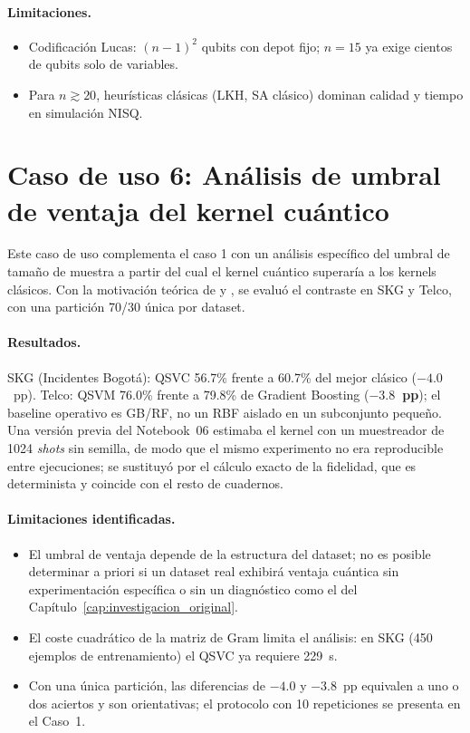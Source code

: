 \paragraph{Limitaciones.}
\begin{itemize}
  \item Codificación Lucas: $(n-1)^2$ qubits con depot fijo; $n=15$ ya exige cientos de qubits solo de variables.
  \item Para $n \gtrsim 20$, heurísticas clásicas (LKH, SA clásico) dominan calidad y tiempo en simulación NISQ.
\end{itemize}

\section{Caso de uso 6: Análisis de umbral de ventaja del kernel cuántico}

Este caso de uso complementa el caso 1 con un análisis específico del umbral de tamaño de muestra a partir del cual el kernel cuántico superaría a los kernels clásicos. Con la motivación teórica de \cite{liu2021} y \cite{huang2021}, se evaluó el contraste en SKG y Telco, con una partición 70/30 única por dataset.

\paragraph{Resultados.}
SKG (Incidentes Bogotá): QSVC 56.7\% frente a 60.7\% del mejor clásico ($-4.0$~pp). Telco: QSVM 76.0\% frente a 79.8\% de Gradient Boosting (\textbf{$-3.8$~pp}); el baseline operativo es GB/RF, no un RBF aislado en un subconjunto pequeño. Una versión previa del Notebook~06 estimaba el kernel con un muestreador de 1024 \emph{shots} sin semilla, de modo que el mismo experimento no era reproducible entre ejecuciones; se sustituyó por el cálculo exacto de la fidelidad, que es determinista y coincide con el resto de cuadernos.

\paragraph{Limitaciones identificadas.}
\begin{itemize}
  \item El umbral de ventaja depende de la estructura del dataset; no es posible determinar a priori si un dataset real exhibirá ventaja cuántica sin experimentación específica o sin un diagnóstico como el del Capítulo~\ref{cap:investigacion_original}.
  \item El coste cuadrático de la matriz de Gram limita el análisis: en SKG (450 ejemplos de entrenamiento) el QSVC ya requiere 229~s.
  \item Con una única partición, las diferencias de $-4.0$ y $-3.8$~pp equivalen a uno o dos aciertos y son orientativas; el protocolo con 10 repeticiones se presenta en el Caso~1.
\end{itemize}

